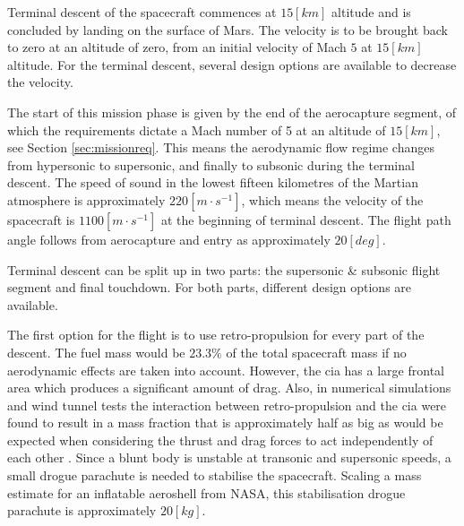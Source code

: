 Terminal descent of the spacecraft commences at $15 \left[km\right]$ altitude and is concluded by landing on the surface of Mars. The velocity is to be brought back to zero at an altitude of zero, from an initial velocity of Mach $5$ at $15 \left[km\right]$ altitude. For the terminal descent, several design options are available to decrease the velocity.%

The start of this mission phase is given by the end of the aerocapture segment, of which the requirements dictate a Mach number of 5 at an altitude of $15 \left[km\right]$, see Section \ref{sec:missionreq}. This means the aerodynamic flow regime changes from hypersonic to supersonic, and finally to subsonic during the terminal descent. The speed of sound in the lowest fifteen kilometres of the Martian atmosphere is approximately $220 \left[m\cdot s^{-1}\right]$, which means the velocity of the spacecraft is $1100 \left[m\cdot s^{-1}\right]$ at the beginning of terminal descent. The flight path angle follows from aerocapture and entry as approximately $20 \left[deg\right]$.%

Terminal descent can be split up in two parts: the supersonic \& subsonic flight segment and final touchdown. For both parts, different design options are available.

The first option for the flight is to use retro-propulsion for every part of the descent. The fuel mass would be $23.3\%$ of the total spacecraft mass if no aerodynamic effects are taken into account. However, the \gls{cia} has a large frontal area which produces a significant amount of drag. Also, in numerical simulations and wind tunnel tests the interaction between retro-propulsion and the \gls{cia} were found to result in a mass fraction that is approximately half as big as would be expected when considering the thrust and drag forces to act independently of each other \cite{Korzun2009}. Since a blunt body is unstable at transonic and supersonic speeds, a small drogue parachute is needed to stabilise the spacecraft. Scaling a mass estimate for an inflatable aeroshell from NASA, this stabilisation drogue parachute is approximately $20 \left[kg\right]$.

